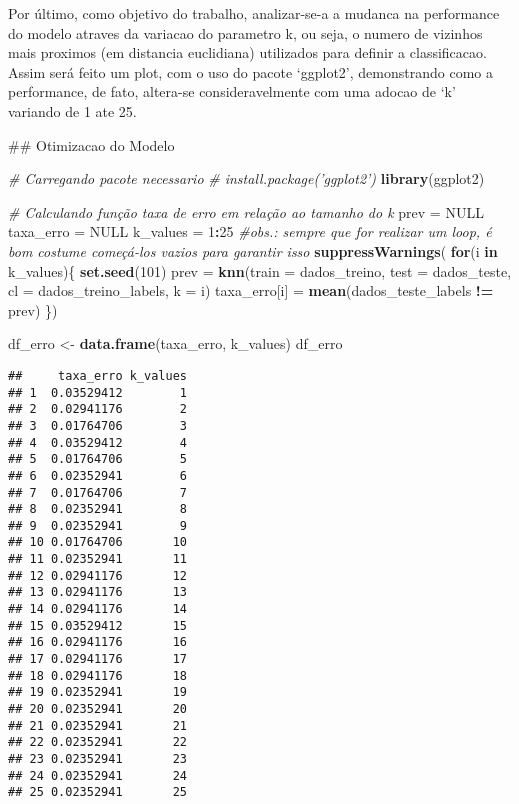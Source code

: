 \documentclass[]{article}
\newenvironment{Shaded}{\begin{snugshade}}{\end{snugshade}}
\newcommand{\KeywordTok}[1]{\textcolor[rgb]{0.13,0.29,0.53}{\textbf{#1}}}
\newcommand{\DataTypeTok}[1]{\textcolor[rgb]{0.13,0.29,0.53}{#1}}
\newcommand{\DecValTok}[1]{\textcolor[rgb]{0.00,0.00,0.81}{#1}}
\newcommand{\StringTok}[1]{\textcolor[rgb]{0.31,0.60,0.02}{#1}}
\newcommand{\CommentTok}[1]{\textcolor[rgb]{0.56,0.35,0.01}{\textit{#1}}}
\newcommand{\OtherTok}[1]{\textcolor[rgb]{0.56,0.35,0.01}{#1}}
\newcommand{\ControlFlowTok}[1]{\textcolor[rgb]{0.13,0.29,0.53}{\textbf{#1}}}
\newcommand{\OperatorTok}[1]{\textcolor[rgb]{0.81,0.36,0.00}{\textbf{#1}}}
\newcommand{\NormalTok}[1]{#1}
\begin{document}
Por último, como objetivo do trabalho, analizar-se-a a mudanca na
performance do modelo atraves da variacao do parametro k, ou seja, o
numero de vizinhos mais proximos (em distancia euclidiana) utilizados
para definir a classificacao. Assim será feito um plot, com o uso do
pacote `ggplot2', demonstrando como a performance, de fato, altera-se
consideravelmente com uma adocao de `k' variando de 1 ate 25.

\begin{Shaded}
\begin{Highlighting}[]
\NormalTok{## Otimizacao do Modelo}

\CommentTok{# Carregando pacote necessario}
\CommentTok{# install.package('ggplot2')}
\KeywordTok{library}\NormalTok{(ggplot2)}

\CommentTok{# Calculando função taxa de erro em relação ao tamanho do k}
\NormalTok{prev =}\StringTok{ }\OtherTok{NULL}
\NormalTok{taxa_erro =}\StringTok{ }\OtherTok{NULL}
\NormalTok{k_values =}\StringTok{ }\DecValTok{1}\OperatorTok{:}\DecValTok{25}
\CommentTok{#obs.: sempre que for realizar um loop, é bom costume começá-los vazios para garantir isso}
\KeywordTok{suppressWarnings}\NormalTok{(}
  \ControlFlowTok{for}\NormalTok{(i }\ControlFlowTok{in}\NormalTok{ k_values)\{}
    \KeywordTok{set.seed}\NormalTok{(}\DecValTok{101}\NormalTok{)}
\NormalTok{    prev =}\StringTok{ }\KeywordTok{knn}\NormalTok{(}\DataTypeTok{train =}\NormalTok{ dados_treino,}
               \DataTypeTok{test =}\NormalTok{ dados_teste,}
               \DataTypeTok{cl =}\NormalTok{ dados_treino_labels,}
               \DataTypeTok{k =}\NormalTok{ i)}
\NormalTok{    taxa_erro[i] =}\StringTok{ }\KeywordTok{mean}\NormalTok{(dados_teste_labels }\OperatorTok{!=}\StringTok{ }\NormalTok{prev)}
\NormalTok{  \})}

\NormalTok{df_erro <-}\StringTok{ }\KeywordTok{data.frame}\NormalTok{(taxa_erro, k_values)}
\NormalTok{df_erro}
\end{Highlighting}
\end{Shaded}

\begin{verbatim}
##     taxa_erro k_values
## 1  0.03529412        1
## 2  0.02941176        2
## 3  0.01764706        3
## 4  0.03529412        4
## 5  0.01764706        5
## 6  0.02352941        6
## 7  0.01764706        7
## 8  0.02352941        8
## 9  0.02352941        9
## 10 0.01764706       10
## 11 0.02352941       11
## 12 0.02941176       12
## 13 0.02941176       13
## 14 0.02941176       14
## 15 0.03529412       15
## 16 0.02941176       16
## 17 0.02941176       17
## 18 0.02941176       18
## 19 0.02352941       19
## 20 0.02352941       20
## 21 0.02352941       21
## 22 0.02352941       22
## 23 0.02352941       23
## 24 0.02352941       24
## 25 0.02352941       25
\end{verbatim}
\end{document}
